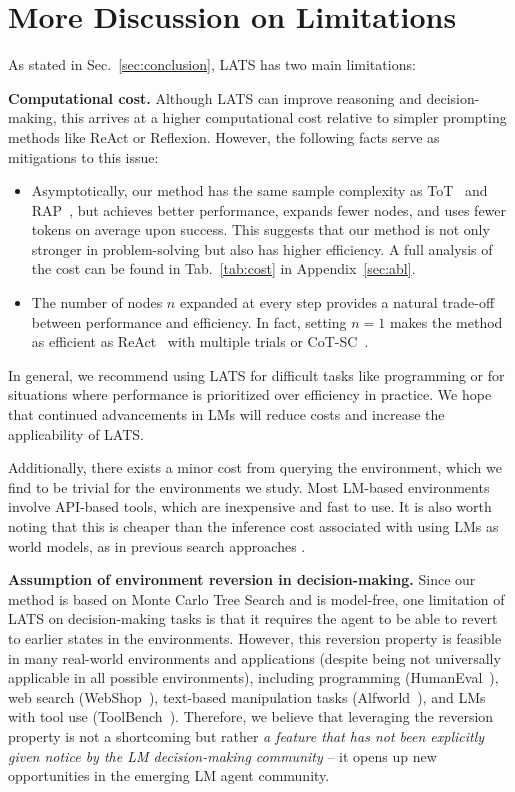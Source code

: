 \section{More Discussion on Limitations}

\label{sec:discussion}

As stated in Sec.~\ref{sec:conclusion}, LATS has two main limitations: 

\textbf{Computational cost.} Although LATS can improve reasoning and decision-making, this arrives at a higher computational cost relative to simpler prompting methods like ReAct or Reflexion. However, the following facts serve as mitigations to this issue:

\begin{itemize}
    \item Asymptotically, our method has the same sample complexity as ToT~\cite{yao2023tree} and RAP~\cite{hao2023reasoning}, but achieves better performance, expands fewer nodes, and uses fewer tokens on average upon success. This suggests that our method is not only stronger in problem-solving but also has higher efficiency. A full analysis of the cost can be found in Tab.~\ref{tab:cost} in Appendix~\ref{sec:abl}.
    \item The number of nodes $n$ expanded at every step provides a natural trade-off between performance and efficiency. In fact, setting $n=1$ makes the method as efficient as ReAct~\cite{yao2023react} with multiple trials or CoT-SC~\cite{wang2022self}.
\end{itemize}

In general, we recommend using LATS for difficult tasks like programming or for situations where performance is prioritized over efficiency in practice. We hope that continued advancements in LMs will reduce costs and increase the applicability of LATS.

{Additionally, there exists a minor cost from querying the environment, which we find to be trivial for the environments we study. Most LM-based environments involve API-based tools, which are inexpensive and fast to use. It is also worth noting that this is cheaper than the inference cost associated with using LMs as world models, as in previous search approaches \cite{hao2023reasoning, liu2023reason}.}

\textbf{Assumption of environment reversion in decision-making.} Since our method is based on Monte Carlo Tree Search and is model-free, one limitation of LATS on decision-making tasks is that it requires the agent to be able to revert to earlier states in the environments. However, this reversion property is feasible in many real-world environments and applications (despite being not universally applicable in all possible environments), including programming (HumanEval~\cite{chen2021evaluating}), web search (WebShop~\cite{yao2022webshop}), text-based manipulation tasks (Alfworld~\cite{shridhar2020alfworld}), and LMs with tool use (ToolBench~\cite{qin2023toolllm}). Therefore, we believe that leveraging the reversion property is not a shortcoming but rather \textit{a feature that has not been explicitly given notice by the LM decision-making community} -- it opens up new opportunities in the emerging LM agent community.

